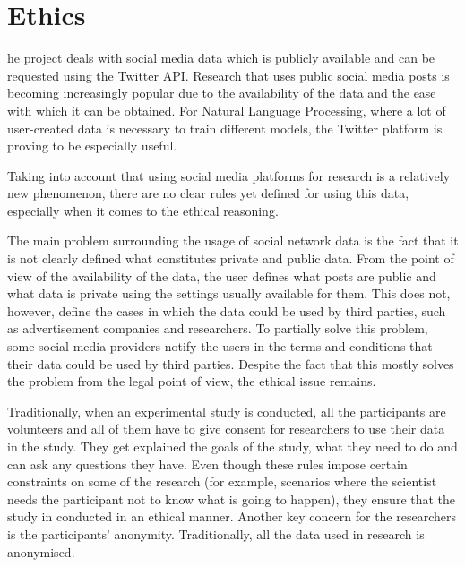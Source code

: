 \let\textcircled=\pgftextcircled
\chapter{Ethics}
\label{chap:ethics}

he project deals with social media data which is publicly available and can be requested using the Twitter API. Research that uses public social media posts is becoming increasingly popular due to the availability of the data and the ease with which it can be obtained. For Natural Language Processing, where a lot of user-created data is necessary to train different models, the Twitter platform is proving to be especially useful. 

Taking into account that using social media platforms for research is a relatively new phenomenon, there are no clear rules yet defined for using this data, especially when it comes to the ethical reasoning. 

The main problem surrounding the usage of social network data is the fact that it is not clearly defined what constitutes private and public data. From the point of view of the availability of the data, the user defines what posts are public and what data is private using the settings usually available for them. This does not, however, define the cases in which the data could be used by third parties, such as advertisement companies and researchers. To partially solve this problem, some social media providers notify the users in the terms and conditions that their data could be used by third parties. Despite the fact that this mostly solves the problem from the legal point of view, the ethical issue remains. 

Traditionally, when an experimental study is conducted, all the participants are volunteers and all of them have to give consent for researchers to use their data in the study. They get explained the goals of the study, what they need to do and can ask any questions they have. Even though these rules impose certain constraints on some of the research (for example, scenarios where the scientist needs the participant not to know what is going to happen), they ensure that the study in conducted in an ethical manner. Another key concern for the researchers is the participants' anonymity. Traditionally, all the data used in research is anonymised. 

